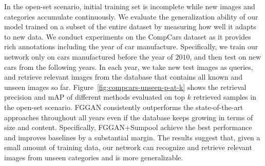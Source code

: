 \documentclass[runningheads]{llncs}
\begin{document}
In the open-set scenario, initial training set is incomplete while new images and categories accumulate continuously.
We evaluate the generalization ability of our model trained on a subset of the entire dataset by measuring how well it adapts to new data.
We conduct experiments on the CompCars dataset as it provides rich annotations including the year of car manufacture.
Specifically, we train our network only on cars manufactured before the year of $2010$, and then test on new cars from the following years.
In each year, we take new test images as queries, and retrieve relevant images from the database that contains all known and unseen images so far. 
Figure~\ref{fig:compcars-unseen-p-at-k} shows the retrieval precision and mAP of different methods evaluated on top $k$ retrieved samples in the open-set scenario. FGGAN consistently outperforms the state-of-the-art approaches throughout all years even if the database keeps growing in terms of size and content.
Specifically, FGGAN$+$Sumpool achieve the best performance and improves baselines by a substantial margin.
The results suggest that, given a small amount of training data, our network can recognize and retrieve relevant images from unseen categories and is more generalizable.
\end{document}
